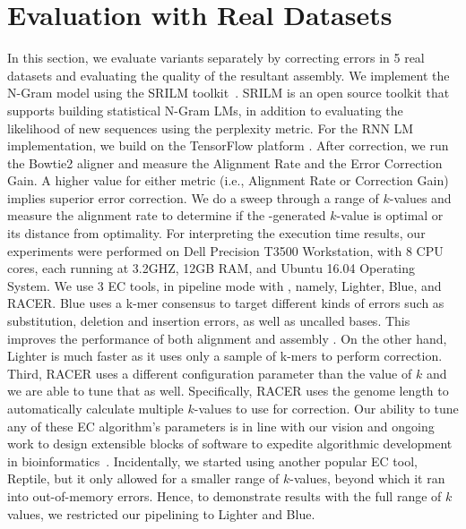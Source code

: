 \vspace{-5pt}
\section{Evaluation with Real Datasets}
\label{sec:evaluation-real}

In this section, we evaluate \name variants separately by correcting errors in 5 real datasets and evaluating the quality of the resultant assembly. We implement the N-Gram model using the SRILM toolkit~\cite{Stolcke02srilm--}. SRILM is an open source toolkit that supports building statistical N-Gram LMs, in addition to evaluating the likelihood of new sequences using the perplexity metric. For the RNN LM implementation, we build on the TensorFlow platform \cite{45381}.
After correction, we run the Bowtie2 aligner \cite{langmead2012fast} and measure the Alignment Rate and the Error Correction Gain. A higher value for either metric (i.e., Alignment Rate or Correction Gain) implies superior error correction.
We do a sweep through a range of $k$-values and measure the alignment rate to determine if the \name-generated $k$-value is optimal or its distance from optimality. For interpreting the execution time results, our experiments were performed on Dell Precision T3500 Workstation, with 8 CPU cores, each running at 3.2GHZ, 12GB RAM, and Ubuntu 16.04 Operating System.
We use 3 EC tools, in pipeline mode with \name, namely, Lighter, Blue, and RACER. Blue uses a k-mer consensus to target different kinds of errors such as substitution, deletion and insertion errors, as well as uncalled bases. This improves the performance of both alignment and assembly \cite{greenfield2014blue}. On the other hand, Lighter is much faster as it uses only a sample of k-mers to perform correction. %
Third, RACER uses a different configuration parameter than the value of $k$ and we are able to tune that as well. Specifically, RACER uses the genome length to automatically calculate multiple $k$-values to use for correction.
Our ability to tune any of these EC algorithm's parameters is in line with our vision and ongoing work to design extensible blocks of software to expedite algorithmic development in bioinformatics~\cite{mahadik2016sarvavid}.
Incidentally, we started using another popular EC tool, Reptile, but it only allowed for a smaller range of $k$-values, beyond which it ran into out-of-memory errors. Hence, to demonstrate results with the full range of $k$ values, we restricted our pipelining to Lighter and Blue. 

